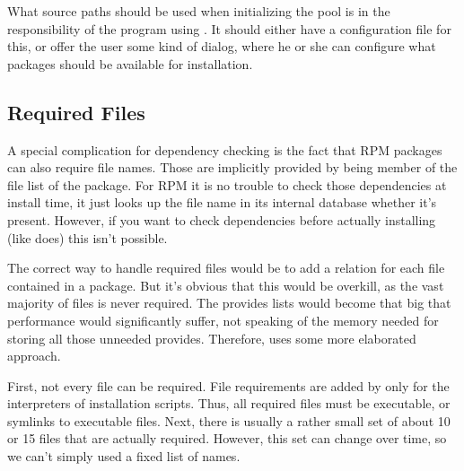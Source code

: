 \documentclass[10pt]{article}
\begin{document}
What source paths should be used when initializing the pool is in the
responsibility of the program using . It should either
have a configuration file for this, or offer the user some kind of
dialog, where he or she can configure what packages should be
available for installation.



\subsection{Required Files}
\label{pkgdb-reqfiles}

A special complication for dependency checking is the fact that RPM
packages can also require file names. Those are implicitly provided by
being member of the file list of the package. For RPM it is no trouble
to check those dependencies at install time, it just looks up the file
name in its internal database whether it's present. However, if you
want to check dependencies before actually installing (like
 does) this isn't possible.

The correct way to handle required files would be to add a
 relation for each file contained in a package. But
it's obvious that this would be overkill, as the vast majority of
files is never required. The provides lists would become that big that
performance would significantly suffer, not speaking of the memory
needed for storing all those unneeded provides. Therefore,
 uses some more elaborated approach.

First, not every file can be required. File requirements are added by
 only for the interpreters of installation scripts. Thus,
all required files must be executable, or symlinks to executable
files. Next, there is usually a rather small set of about 10 or 15
files that are actually required. However, this set can change over
time, so we can't simply used a fixed list of names.
\end{document}
